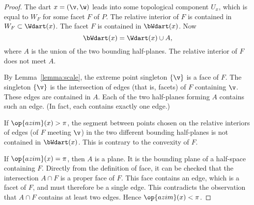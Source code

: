 \begin{proof} The dart $x=(\v,\w)$ leads into some topological
component $U_x$, which is equal to $W_F$ for some facet $F$ of $P$.
The relative interior of $F$ is contained in $W_F\subset \Wdart(x)$.
The facet $F$ is contained in $\bWdart(x)$. Now
\begin{displaymath}
\bWdart(x) = \Wdart(x)\cup A,
\end{displaymath}
where $A$ is the union of the two bounding half-planes.  The relative
interior of $F$ does not meet $A$.

By Lemma~\ref{lemma:scale}, the extreme point singleton $\{\v\}$ is a face of $F$.  The
singleton $\{\v\}$ is the intersection of edges (that is, facets) of $F$
containing $\v$.  These edges are contained in $A$.  Each of the two
half-planes forming $A$ contains such an edge. (In fact, each contains
exactly one edge.)  %
%
%
%

If $\op{azim}(x)>\pi$, the segment between points chosen on the
relative interiors of edges (of $F$ meeting $\v$) in the two different
bounding half-planes is not contained in $\bWdart(x)$.  This is
contrary to the convexity of $F$.  %
%

If $\op{azim}(x)=\pi$, then $A$ is a plane.  It is the bounding plane
of a half-space containing $F$.  Directly from the definition of face,
it can be checked that the intersection $A\cap F$ is a proper face of
$F$.  This face contains an edge, which is a facet of $F$, and must
therefore be a single edge.  This contradicts the observation that
$A\cap F$ contains at least two edges.  Hence $\op{azim}(x)<\pi$.
\end{proof}


